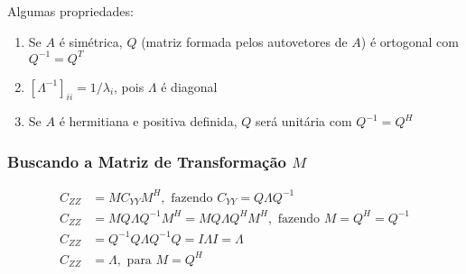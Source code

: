 \documentclass{article}
\begin{document}
Algumas propriedades:
\begin{enumerate}
    \item Se $A$ é simétrica, $Q$ (matriz formada pelos autovetores de $A$) é ortogonal com $Q^{-1} = Q^T$
    \item $[\Lambda^{-1}]_{ii} = 1/\lambda_i$, pois $\Lambda$ é diagonal
    \item Se $A$ é hermitiana e positiva definida, $Q$ será unitária com $Q^{-1} = Q^H$
\end{enumerate}

\subsubsection{Buscando a Matriz de Transformação $M$}
\begin{align*}
    C_{ZZ} &= M C_{YY} M^H, \text{ fazendo } C_{YY} = Q \Lambda Q^{-1} \\
    C_{ZZ} &= M Q \Lambda Q^{-1} M^H = M Q \Lambda Q^H M^H, \text{ fazendo } M = Q^H = Q^{-1} \\
    C_{ZZ} &= Q^{-1}Q \Lambda Q^{-1} Q = I \Lambda I = \Lambda \\
    C_{ZZ} &= \Lambda, \text{ para } M = Q^H
\end{align*}
\end{document}

